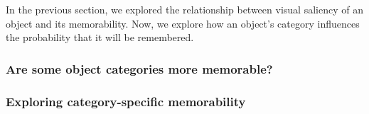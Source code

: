 In the previous section, we explored the relationship between visual saliency of an object and its memorability. Now, we explore how an object's category influences the probability that it will be remembered.

\subsubsection{Are some object categories more memorable?}



\subsubsection{Exploring category-specific memorability}



